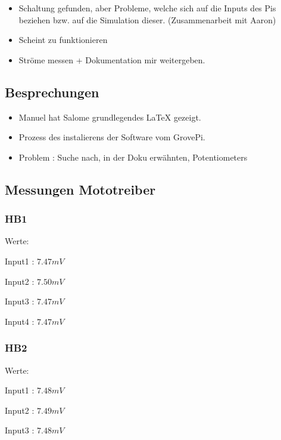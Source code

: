 \documentclass{article}
\begin{document}
\begin{itemize}

\item Schaltung gefunden, aber Probleme, welche sich auf die Inputs des Pis beziehen bzw. auf die Simulation dieser. (Zusammenarbeit mit Aaron)

\item Scheint zu funktionieren

\item Ströme messen + Dokumentation mir weitergeben.

\end{itemize}

\subsection{Besprechungen}

\begin{itemize}

\item Manuel hat Salome grundlegendes LaTeX gezeigt.

\item Prozess des instalierens der Software vom GrovePi.

\item Problem : Suche nach, in der Doku erw\"{a}hnten, Potentiometers

\end{itemize}

\subsection{Messungen Mototreiber}

\subsubsection{HB1}
Werte:

Input1 : $7.47mV$

Input2 : $7.50mV$

Input3 : $7.47mV$

Input4 : $7.47mV$

\subsubsection{HB2}

Werte:

Input1 : $7.48mV$

Input2 : $7.49mV$

Input3 : $7.48mV$
\end{document}
